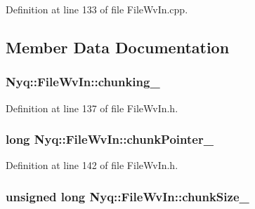Definition at line 133 of file File\+Wv\+In.\+cpp.



\subsection{Member Data Documentation}
\subsubsection[{\texorpdfstring{chunking\+\_\+}{chunking_}}]{ Nyq\+::\+File\+Wv\+In\+::chunking\+\_\+\hspace{0.3cm}{\ttfamily [protected]}}\hypertarget{class_nyq_1_1_file_wv_in_ac27a2fbf1af9d7aeebb9b39b1cc014cc}{}\label{class_nyq_1_1_file_wv_in_ac27a2fbf1af9d7aeebb9b39b1cc014cc}


Definition at line 137 of file File\+Wv\+In.\+h.

\subsubsection[{\texorpdfstring{chunk\+Pointer\+\_\+}{chunkPointer_}}]{\setlength{\rightskip}{0pt plus 5cm}long Nyq\+::\+File\+Wv\+In\+::chunk\+Pointer\+\_\+\hspace{0.3cm}{\ttfamily [protected]}}\hypertarget{class_nyq_1_1_file_wv_in_ad5727fd25c2519e5a1b67c6383849781}{}\label{class_nyq_1_1_file_wv_in_ad5727fd25c2519e5a1b67c6383849781}


Definition at line 142 of file File\+Wv\+In.\+h.

\subsubsection[{\texorpdfstring{chunk\+Size\+\_\+}{chunkSize_}}]{\setlength{\rightskip}{0pt plus 5cm}unsigned long Nyq\+::\+File\+Wv\+In\+::chunk\+Size\+\_\+\hspace{0.3cm}{\ttfamily [protected]}}\hypertarget{class_nyq_1_1_file_wv_in_a5274ad9eca9e1db6092d0b9642e48176}{}\label{class_nyq_1_1_file_wv_in_a5274ad9eca9e1db6092d0b9642e48176}



